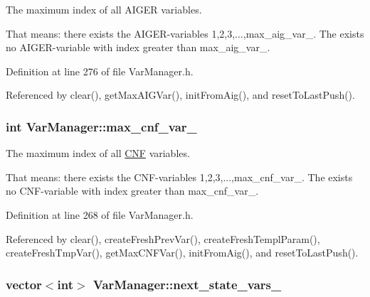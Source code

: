 The maximum index of all A\-I\-G\-E\-R variables. 

That means\-: there exists the A\-I\-G\-E\-R-\/variables 1,2,3,...,max\-\_\-aig\-\_\-var\-\_\-. The exists no A\-I\-G\-E\-R-\/variable with index greater than max\-\_\-aig\-\_\-var\-\_\-. 

Definition at line 276 of file Var\-Manager.\-h.



Referenced by clear(), get\-Max\-A\-I\-G\-Var(), init\-From\-Aig(), and reset\-To\-Last\-Push().

\hypertarget{classVarManager_aa790c99974d2aa97ed1848e49c4c82c6}{
\subsubsection[{max\-\_\-cnf\-\_\-var\-\_\-}]{\setlength{\rightskip}{0pt plus 5cm}int Var\-Manager\-::max\-\_\-cnf\-\_\-var\-\_\-\hspace{0.3cm}{\ttfamily [protected]}}}\label{classVarManager_aa790c99974d2aa97ed1848e49c4c82c6}


The maximum index of all \hyperlink{classCNF}{C\-N\-F} variables. 

That means\-: there exists the C\-N\-F-\/variables 1,2,3,...,max\-\_\-cnf\-\_\-var\-\_\-. The exists no C\-N\-F-\/variable with index greater than max\-\_\-cnf\-\_\-var\-\_\-. 

Definition at line 268 of file Var\-Manager.\-h.



Referenced by clear(), create\-Fresh\-Prev\-Var(), create\-Fresh\-Templ\-Param(), create\-Fresh\-Tmp\-Var(), get\-Max\-C\-N\-F\-Var(), init\-From\-Aig(), and reset\-To\-Last\-Push().

\hypertarget{classVarManager_a2a697fcb384c73821d88104ac904f4e9}{
\subsubsection[{next\-\_\-state\-\_\-vars\-\_\-}]{\setlength{\rightskip}{0pt plus 5cm}vector$<$int$>$ Var\-Manager\-::next\-\_\-state\-\_\-vars\-\_\-\hspace{0.3cm}{\ttfamily [protected]}}}\label{classVarManager_a2a697fcb384c73821d88104ac904f4e9}



